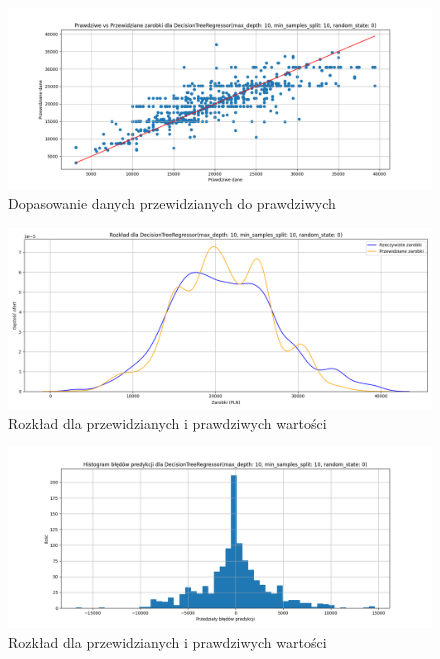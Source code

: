 \documentclass[a4paper]{article}
\begin{document}
\begin{figure}[H]
    \centering
    \includegraphics[width=\textwidth]{../analysis/plots/wyniki/0.8&0.2/DecisionTreeRegressor/scatter.png}
    \caption{Dopasowanie danych przewidzianych do prawdziwych}
\end{figure}

\begin{figure}[H]
    \centering
    \includegraphics[width=\textwidth]{../analysis/plots/wyniki/0.8&0.2/DecisionTreeRegressor/salary_dist.png}
    \caption{Rozkład dla przewidzianych i prawdziwych wartości}
\end{figure}

\begin{figure}[H]
    \centering
    \includegraphics[width=\textwidth]{../analysis/plots/wyniki/0.8&0.2/DecisionTreeRegressor/errors.png}
    \caption{Rozkład dla przewidzianych i prawdziwych wartości}
\end{figure}
\end{document}
